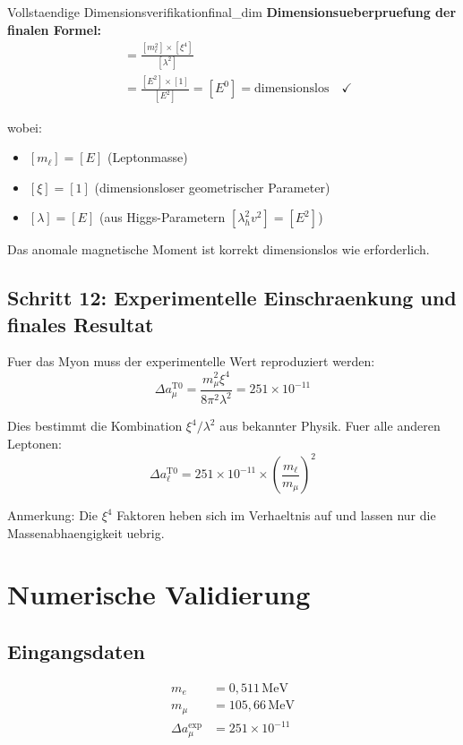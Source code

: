 \documentclass[12pt,a4paper]{article}
\begin{document}
	\begin{important}{Vollstaendige Dimensionsverifikation}{final_dim}
		\textbf{Dimensionsueberpruefung der finalen Formel:}
		\begin{align}
			[\Delta a_\ell] &= \frac{[m_\ell^2] \times [\xi^4]}{[\lambda^2]} \\
			&= \frac{[E^2] \times [1]}{[E^2]} = [E^0] = \text{dimensionslos} \quad \checkmark
		\end{align}
		
		wobei:
		\begin{itemize}
			\item $[m_\ell] = [E]$ (Leptonmasse)
			\item $[\xi] = [1]$ (dimensionsloser geometrischer Parameter)  
			\item $[\lambda] = [E]$ (aus Higgs-Parametern $[\lambda_h^2 v^2] = [E^2]$)
		\end{itemize}
		
		Das anomale magnetische Moment ist korrekt dimensionslos wie erforderlich.
	\end{important}
	
	\subsection{Schritt 12: Experimentelle Einschraenkung und finales Resultat}
	
	Fuer das Myon muss der experimentelle Wert reproduziert werden:
	\begin{equation}
		\Delta a_\mu^{\text{T0}} = \frac{m_\mu^2 \xi^4}{8\pi^2 \lambda^2} = 251 \times 10^{-11}
	\end{equation}
	
	Dies bestimmt die Kombination $\xi^4/\lambda^2$ aus bekannter Physik. Fuer alle anderen Leptonen:
	\begin{equation}
		\boxed{\Delta a_\ell^{\text{T0}} = 251 \times 10^{-11} \times \left(\frac{m_\ell}{m_\mu}\right)^2}
		\label{eq:final_formula}
	\end{equation}
	
	Anmerkung: Die $\xi^4$ Faktoren heben sich im Verhaeltnis auf und lassen nur die Massenabhaengigkeit uebrig.
	
	\section{Numerische Validierung}
	
	\subsection{Eingangsdaten}
	\begin{align*}
		m_e &= 0{,}511\,\text{MeV} \\
		m_\mu &= 105{,}66\,\text{MeV} \\
		\Delta a_\mu^{\text{exp}} &= 251 \times 10^{-11}
	\end{align*}
	
\end{document}
